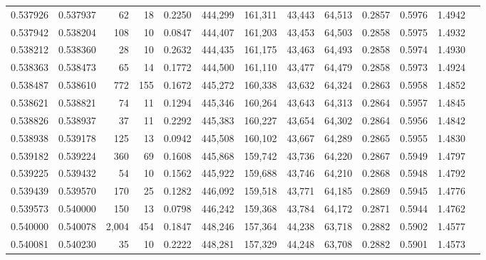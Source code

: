 \begin{tabular}{rrrrrrrrrrrrr}
0.537926 & 0.537937 &    62 &  18 &                                     0.2250 & 444,299 & 161,311 &  43,443 &  64,513 & 0.2857 & 0.5976 & 1.4942 \\
0.537942 & 0.538204 &   108 &  10 &                                     0.0847 & 444,407 & 161,203 &  43,453 &  64,503 & 0.2858 & 0.5975 & 1.4932 \\
0.538212 & 0.538360 &    28 &  10 &                                     0.2632 & 444,435 & 161,175 &  43,463 &  64,493 & 0.2858 & 0.5974 & 1.4930 \\
0.538363 & 0.538473 &    65 &  14 &                                     0.1772 & 444,500 & 161,110 &  43,477 &  64,479 & 0.2858 & 0.5973 & 1.4924 \\
0.538487 & 0.538610 &   772 & 155 &                                     0.1672 & 445,272 & 160,338 &  43,632 &  64,324 & 0.2863 & 0.5958 & 1.4852 \\
0.538621 & 0.538821 &    74 &  11 &                                     0.1294 & 445,346 & 160,264 &  43,643 &  64,313 & 0.2864 & 0.5957 & 1.4845 \\
0.538826 & 0.538937 &    37 &  11 &                                     0.2292 & 445,383 & 160,227 &  43,654 &  64,302 & 0.2864 & 0.5956 & 1.4842 \\
0.538938 & 0.539178 &   125 &  13 &                                     0.0942 & 445,508 & 160,102 &  43,667 &  64,289 & 0.2865 & 0.5955 & 1.4830 \\
0.539182 & 0.539224 &   360 &  69 &                                     0.1608 & 445,868 & 159,742 &  43,736 &  64,220 & 0.2867 & 0.5949 & 1.4797 \\
0.539225 & 0.539432 &    54 &  10 &                                     0.1562 & 445,922 & 159,688 &  43,746 &  64,210 & 0.2868 & 0.5948 & 1.4792 \\
0.539439 & 0.539570 &   170 &  25 &                                     0.1282 & 446,092 & 159,518 &  43,771 &  64,185 & 0.2869 & 0.5945 & 1.4776 \\
0.539573 & 0.540000 &   150 &  13 &                                     0.0798 & 446,242 & 159,368 &  43,784 &  64,172 & 0.2871 & 0.5944 & 1.4762 \\
0.540000 & 0.540078 & 2,004 & 454 &                                     0.1847 & 448,246 & 157,364 &  44,238 &  63,718 & 0.2882 & 0.5902 & 1.4577 \\
0.540081 & 0.540230 &    35 &  10 &                                     0.2222 & 448,281 & 157,329 &  44,248 &  63,708 & 0.2882 & 0.5901 & 1.4573 \\

\end{tabular}
